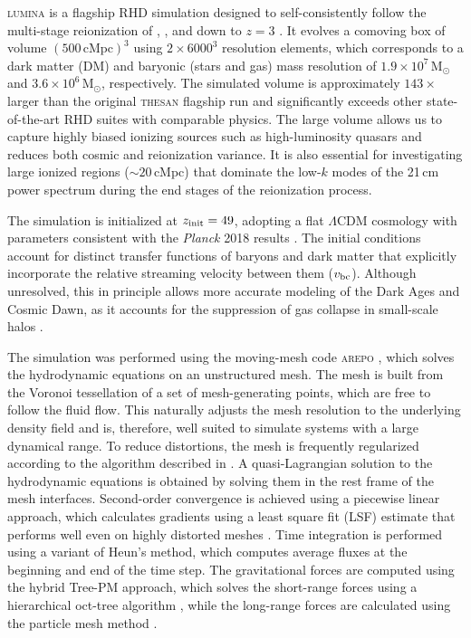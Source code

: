 \documentclass[apj,twocolumn, appendixfloats, twocolappendix, numberedappendix, tighten]{openjournal}
\DeclareRobustCommand{\lumina}{\mbox{\textsc{lumina}}\xspace}
\begin{document}
\lumina is a flagship RHD simulation designed to self-consistently follow the multi-stage reionization of , , and  down to $z=3$ \citep[][]{Zier2026}. It evolves a comoving box of volume $(500 \,\mathrm{cMpc})^3$ using $2\times 6000^3$ resolution elements, which corresponds to a dark matter (DM) and baryonic (stars and gas) mass resolution of $1.9 \times 10^7 \,\mathrm{M}_\odot$ and $3.6 \times 10^{6} \,\mathrm{M}_\odot$, respectively. The simulated volume is approximately $143 \times$ larger than the original \textsc{thesan} \citep[][]{Kannan2022} flagship run and significantly exceeds other state-of-the-art RHD suites with comparable physics.
The large volume allows us to capture highly biased ionizing sources such as high-luminosity quasars and reduces both cosmic and reionization variance. It is also essential for investigating large ionized regions ($\sim 20$\,cMpc) that dominate the low-$k$ modes of the 21\,cm power spectrum during the end stages of the reionization process.

The simulation is initialized at $z_{\rm init} = 49$, adopting a flat $\Lambda$CDM cosmology with parameters consistent with the \textit{Planck} 2018 results \citep[][]{Planck2020}. The initial conditions account for distinct transfer functions of baryons and dark matter that explicitly incorporate the relative streaming velocity between them ($v_{\rm bc}$). Although unresolved, this in principle allows more accurate modeling of the Dark Ages and Cosmic Dawn, as it accounts for the suppression of gas collapse in small-scale halos \citep{Tseliakhovich2010}. %

The simulation was performed using the moving-mesh code \textsc{arepo} \citep[][]{Springel2010, Weinberger2020}, which solves the hydrodynamic equations on an unstructured mesh. The mesh is built from the Voronoi tessellation of a set of mesh-generating points, which are free to follow the fluid flow. This naturally adjusts the mesh resolution to the underlying density field and is, therefore, well suited to simulate systems with a large dynamical range. To reduce distortions, the mesh is frequently regularized according to the algorithm described in \citet{Vogelsberger2012}. A quasi-Lagrangian solution to the hydrodynamic equations is obtained by solving them in the rest frame of the mesh interfaces. Second-order convergence is achieved using a piecewise linear approach, which calculates gradients using a least square fit (LSF) estimate that performs well even on highly distorted meshes \citep[][]{Pakmor2016}. Time integration is performed using a variant of Heun’s method, which computes average fluxes at the beginning and end of the time step. The gravitational forces are computed using the hybrid Tree-PM approach, which solves the short-range forces using a hierarchical oct-tree algorithm \citep[][]{Barnes1986}, while the long-range forces are calculated using the particle mesh method \citep[][]{Aarseth2003}.
\end{document}
